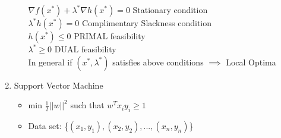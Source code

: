 \documentclass[a4paper]{article}
\begin{document}
\begin{enumerate}
\begin{itemize}
         $\nabla f(x^*) + \lambda^*\nabla h(x^*) = 0$ Stationary condition\\
         $\lambda^*h(x^*) = 0$ Complimentary Slackness condition\\
         $h(x^*) \leq 0$ PRIMAL feasibility\\
         $\lambda^* \geq 0$ DUAL feasibility\\
         In general if $(x^*,\lambda^*)$ satisfies above conditions $\implies$ Local Optima
     \end{itemize}
     \item Support Vector Machine
     \begin{itemize}
         \item min $\frac{1}{2}||w||^2$ such that $w^Tx_iy_i\geq 1$
         \item Data set: \{$(x_1,y_1),(x_2,y_2),...,(x_n,y_n)$\}
     \end{itemize}
 \end{enumerate}
 
\end{document}
